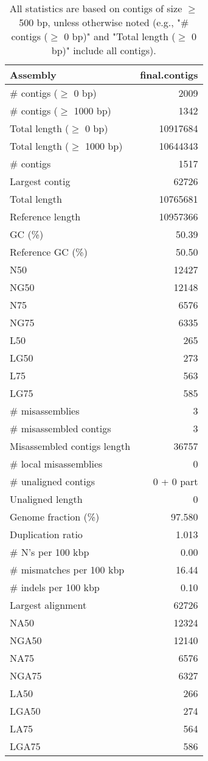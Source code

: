 \documentclass[12pt,a4paper]{article}
\begin{document}
\begin{table}[ht]
\begin{center}
\caption{All statistics are based on contigs of size $\geq$ 500 bp, unless otherwise noted (e.g., "\# contigs ($\geq$ 0 bp)" and "Total length ($\geq$ 0 bp)" include all contigs).}
\begin{tabular}{|l*{1}{|r}|}
\hline
Assembly & final.contigs \\ \hline
\# contigs ($\geq$ 0 bp) & 2009 \\ \hline
\# contigs ($\geq$ 1000 bp) & 1342 \\ \hline
Total length ($\geq$ 0 bp) & 10917684 \\ \hline
Total length ($\geq$ 1000 bp) & 10644343 \\ \hline
\# contigs & 1517 \\ \hline
Largest contig & 62726 \\ \hline
Total length & 10765681 \\ \hline
Reference length & 10957366 \\ \hline
GC (\%) & 50.39 \\ \hline
Reference GC (\%) & 50.50 \\ \hline
N50 & 12427 \\ \hline
NG50 & 12148 \\ \hline
N75 & 6576 \\ \hline
NG75 & 6335 \\ \hline
L50 & 265 \\ \hline
LG50 & 273 \\ \hline
L75 & 563 \\ \hline
LG75 & 585 \\ \hline
\# misassemblies & 3 \\ \hline
\# misassembled contigs & 3 \\ \hline
Misassembled contigs length & 36757 \\ \hline
\# local misassemblies & 0 \\ \hline
\# unaligned contigs & 0 + 0 part \\ \hline
Unaligned length & 0 \\ \hline
Genome fraction (\%) & 97.580 \\ \hline
Duplication ratio & 1.013 \\ \hline
\# N's per 100 kbp & 0.00 \\ \hline
\# mismatches per 100 kbp & 16.44 \\ \hline
\# indels per 100 kbp & 0.10 \\ \hline
Largest alignment & 62726 \\ \hline
NA50 & 12324 \\ \hline
NGA50 & 12140 \\ \hline
NA75 & 6576 \\ \hline
NGA75 & 6327 \\ \hline
LA50 & 266 \\ \hline
LGA50 & 274 \\ \hline
LA75 & 564 \\ \hline
LGA75 & 586 \\ \hline
\end{tabular}
\end{center}
\end{table}
\end{document}
